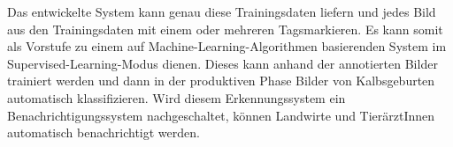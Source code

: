 Das entwickelte System kann genau diese Trainingsdaten liefern und jedes Bild aus den Trainingsdaten mit einem oder mehreren \flqq Tags\frqq markieren. Es kann somit als Vorstufe zu einem auf Machine-Learning-Algorithmen basierenden System im Supervised-Learning-Modus dienen. Dieses kann anhand der annotierten Bilder trainiert werden und dann in der produktiven Phase Bilder von Kalbsgeburten automatisch klassifizieren. Wird diesem Erkennungssystem ein Benachrichtigungssystem nachgeschaltet, können Landwirte und TierärztInnen automatisch benachrichtigt werden.